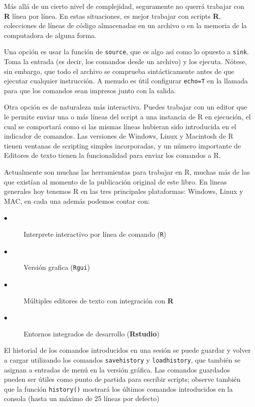 Más allá de un cierto nivel de complejidad, seguramente no querrá trabajar con
\textbf{R} línea por línea. En estas situaciones, es mejor trabajar con scripts
\textbf{R}, colecciones de líneas de código almacenadas en un archivo o en la
memoria de la computadora de alguna forma. 

Una opción es usar la función de \texttt{source}, que es algo así como lo
opuesto a \texttt{sink}. Toma la entrada (es decir, los comandos desde un
archivo) y los ejecuta. Nótese, sin embargo, que todo el archivo se comprueba
sintácticamente antes de que ejecutar cualquier instrucción. A menudo es útil
configurar \texttt{echo=T} en la llamada para que los comandos sean impresos
junto con la salida. 

Otra opción es de naturaleza más interactiva. Puedes trabajar con un editor que
le permite enviar una o más líneas del script a una instancia de R en
ejecución, el cual se comportará como si las mismas líneas hubieran sido
introducida en el indicador de comandos. Las versiones de Windows, Linux y
Macintosh de R tienen ventanas de scripting simples incorporadas, y un número
importante de Editores de texto tienen la funcionalidad para enviar los
comandos a R.

\begin{tradnote} 
	
	Actualmente son muchas las herramientas para trabajar en R, muchas más de
	las que existían al momento de la publicación original de este libro. En
	lineas generales hoy tenemos R en las tres principales plataformas:
	Windows, Linux y MAC, en cada una además podemos contar con:

	\begin{description}
	\item[$\bullet$] Interprete interactivo por línea de comando (\texttt{R})
	\item[$\bullet$] Versión grafica (\texttt{Rgui})
	\item[$\bullet$] Múltiples editores de texto con integración con \textbf{R}
	\item[$\bullet$] Entornos integrados de desarrollo (\textbf{Rstudio})
	\end{description}

\end{tradnote}

El historial de los comandos introducidos en una sesión se puede guardar y
volver a cargar utilizando los comandos \texttt{savehistory} y
\texttt{loadhistory}, que también se asignan a entradas de menú en la versión
gráfica. Las comandos guardados pueden ser útiles como punto de partida para
escribir scripts; observe también que la función \texttt{history()} mostrará
los últimos comandos introducidos en la consola (hasta un máximo de 25 líneas
por defecto)

